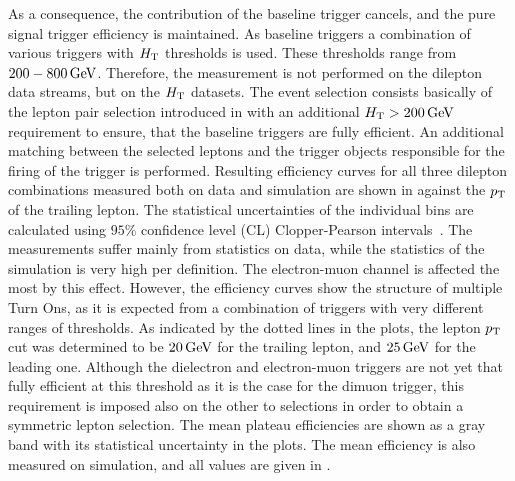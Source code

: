 As a consequence, the contribution of the baseline trigger cancels, and the pure signal trigger efficiency is maintained. As baseline triggers a combination of various triggers with $H_{\mathrm{T}}$ thresholds is used. These thresholds range from $200-800\,\text{Ge\hspace{-.08em}V}$. Therefore, the measurement is not performed on the dilepton data streams, but on the $H_{\mathrm{T}}$ datasets. The event selection consists basically of the lepton pair selection introduced in  with an additional $H_{\mathrm{T}}>200\,\text{Ge\hspace{-.08em}V}$ requirement to ensure, that the baseline triggers are fully efficient. An additional matching between the selected leptons and the trigger objects responsible for the firing of the trigger is performed. Resulting efficiency curves for all three dilepton combinations measured both on data and simulation are shown in  against the $p_{\mathrm{T}}$ of the trailing lepton. The statistical uncertainties of the individual bins are calculated using $95\%$ confidence level (CL) Clopper-Pearson intervals~\cite{ClopperPearson}. The measurements suffer mainly from statistics on data, while the statistics of the simulation is very high per definition. The electron-muon channel is affected the most by this effect. However, the efficiency curves show the structure of multiple Turn Ons, as it is expected from a combination of triggers with very different ranges of thresholds. As indicated by the dotted lines in the plots, the lepton $p_{\mathrm{T}}$ cut was determined to be $20\,\text{Ge\hspace{-.08em}V}$ for the trailing lepton, and $25\,\text{Ge\hspace{-.08em}V}$ for the leading one. Although the dielectron and electron-muon triggers are not yet that fully efficient at this threshold as it is the case for the dimuon trigger, this requirement is imposed also on the other to selections in order to obtain a symmetric lepton selection. The mean plateau efficiencies are shown as a gray band with its statistical uncertainty in the plots. The mean efficiency is also measured on simulation, and all values are given in .
